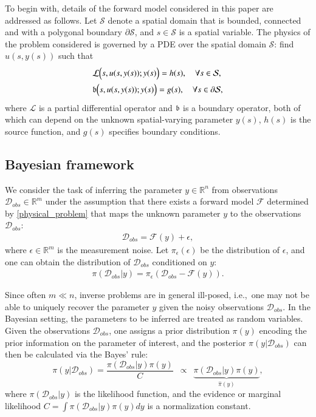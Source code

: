 To begin with, details of the forward  model considered in this paper are addressed as follows. Let $\mathcal{S}$ denote a spatial domain that is bounded, connected and with a polygonal boundary $\partial \mathcal{S}$, and $s\in \mathcal{S}$ is  a spatial variable. The physics of the problem considered is governed by a PDE over the spatial domain $\mathcal{S}$: find $u(s,y(s))$ such that
\begin{equation}\label{physical_problem}
	\begin{aligned}
		&\mathcal{L}\Big(s,u(s,y(s));y(s)\Big)=h(s),\quad \forall s\in \mathcal{S},\\
		&\mathfrak{b}\Big(s,u(s,y(s));y(s)\Big)=g(s),\quad \forall s\in \partial\mathcal{S},
	\end{aligned}
\end{equation}
where $\mathcal{L}$ is a partial differential operator and $\mathfrak{b}$ is a boundary operator, both of which can depend on the unknown spatial-varying parameter $y(s)$, $h(s)$ is the source function, and  $g(s)$ specifies boundary conditions.

\subsection{Bayesian framework}
We consider the task of inferring the parameter $y\in \mathbb{R}^n$ from observations $\mathcal{D}_{obs}\in \mathbb{R}^m$ under the assumption that there exists a forward model $\mathcal{F}$ determined by \eqref{physical_problem} that maps the unknown parameter $y$ to the observations $\mathcal{D}_{obs}$:
\begin{align}
    \mathcal{D}_{obs}=\mathcal{F}(y)+\epsilon,
\end{align}
where $\epsilon\in \mathbb{R}^m$ is the measurement noise. Let $\pi_{\epsilon}(\epsilon)$ be the distribution of $\epsilon$, and one can obtain the distribution of $\mathcal{D}_{obs}$ conditioned on $y$:
\begin{align}
    \pi(\mathcal{D}_{obs}|y)=\pi_{\epsilon}(\mathcal{D}_{obs}-\mathcal{F}(y)).
\end{align}

Since often $m\ll n$, inverse problems are in general ill-posed, i.e.,\ one may not be able to uniquely recover the parameter $y$ given the noisy observations $\mathcal{D}_{obs}$. In the Bayesian setting, the parameters to be inferred are treated as random variables. Given the observations $\mathcal{D}_{obs}$, one assigns a prior distribution $\pi(y)$ encoding the prior information on the parameter of interest, and the posterior $\pi(y|\mathcal{D}_{obs})$ can then be calculated via the Bayes' rule:
\begin{equation}\label{yposterior}
\pi(y|\mathcal{D}_{obs})=\frac{\pi(\mathcal{D}_{obs}|y)\pi(y)}{C} \,\,\,
	\propto \,\,\,\underbrace{\pi(\mathcal{D}_{obs}|y)\pi(y)}_{\hat{\pi}(y)},
\end{equation}
where $\pi(\mathcal{D}_{obs}|y)$ is the likelihood function, and the evidence or marginal likelihood $C=\int \pi(\mathcal{D}_{obs}|y)\pi(y) dy$ is a normalization constant. 

